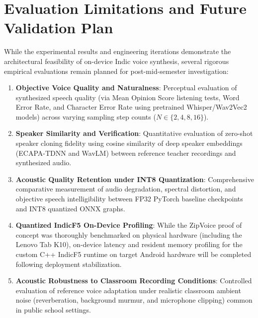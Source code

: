 \section{Evaluation Limitations and Future Validation Plan}
\label{sec:eval_limitations}
While the experimental results and engineering iterations demonstrate the architectural feasibility of on-device Indic voice synthesis, several rigorous empirical evaluations remain planned for post-mid-semester investigation:
\begin{enumerate}
    \item \textbf{Objective Voice Quality and Naturalness}: Perceptual evaluation of synthesized speech quality (via Mean Opinion Score listening tests, Word Error Rate, and Character Error Rate using pretrained Whisper/Wav2Vec2 models) across varying sampling step counts ($N \in \{2, 4, 8, 16\}$).
    \item \textbf{Speaker Similarity and Verification}: Quantitative evaluation of zero-shot speaker cloning fidelity using cosine similarity of deep speaker embeddings (ECAPA-TDNN and WavLM) between reference teacher recordings and synthesized audio.
    \item \textbf{Acoustic Quality Retention under INT8 Quantization}: Comprehensive comparative measurement of audio degradation, spectral distortion, and objective speech intelligibility between FP32 PyTorch baseline checkpoints and INT8 quantized ONNX graphs.
    \item \textbf{Quantized IndicF5 On-Device Profiling}: While the ZipVoice proof of concept was thoroughly benchmarked on physical hardware (including the Lenovo Tab K10), on-device latency and resident memory profiling for the custom C++ IndicF5 runtime on target Android hardware will be completed following deployment stabilization.
    \item \textbf{Acoustic Robustness to Classroom Recording Conditions}: Controlled evaluation of reference voice adaptation under realistic classroom ambient noise (reverberation, background murmur, and microphone clipping) common in public school settings.
\end{enumerate}